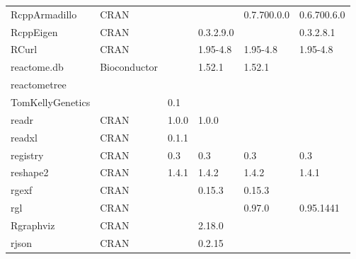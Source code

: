 \begin{longtable}{llllll}
\rowcolor{black!10}
RcppArmadillo                 & CRAN                      &             &             & 0.7.700.0.0    & 0.6.700.6.0       \\
\rowcolor{black!5}
RcppEigen                     & CRAN                      &             & 0.3.2.9.0   &                & 0.3.2.8.1          \\
\rowcolor{black!10}
RCurl                         & CRAN                      &             & 1.95-4.8    & 1.95-4.8       & 1.95-4.8          \\
\rowcolor{black!5}
reactome.db                   & Bioconductor              &             & 1.52.1      & 1.52.1         &                    \\
\rowcolor{black!10}
reactometree                  & \begin{tabular}[c]{@{}l@{}}GitHub \\ TomKellyGenetics \end{tabular}  &             & 0.1         &                &                   \\
\rowcolor{black!5}
readr                         & CRAN                      & 1.0.0       & 1.0.0       &                &                    \\
\rowcolor{black!10}
readxl                        & CRAN                      & 0.1.1       &             &                &                   \\
\rowcolor{black!5}
registry                      & CRAN                      & 0.3         & 0.3         & 0.3            & 0.3                \\
\rowcolor{black!10}
reshape2                      & CRAN                      & 1.4.1       & 1.4.2       & 1.4.2          & 1.4.1             \\
\rowcolor{black!5}
rgexf                         & CRAN                      &             & 0.15.3      & 0.15.3         &                    \\
\rowcolor{black!10}
rgl                           & CRAN                      &             &             & 0.97.0         & 0.95.1441         \\
\rowcolor{black!5}
Rgraphviz                     & CRAN                      &             & 2.18.0      &                &                    \\
\rowcolor{black!10}
rjson                         & CRAN                      &             & 0.2.15      &                &                   \\

\end{longtable}
